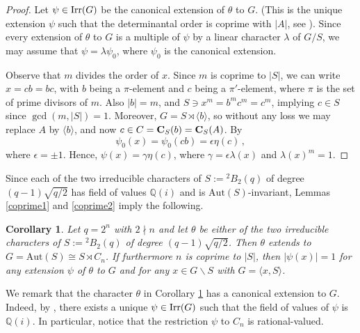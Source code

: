 \documentclass[11pt]{amsart}
\theoremstyle{plain}
\newtheorem{cor}[thm]{Corollary}
\theoremstyle{definition}
\numberwithin{thm}{section}
\numberwithin{equation}{thm}
\newcommand{\Aut}{\mathrm{Aut}}
\def\irr#1{{\rm Irr}(#1)}
\def\cent#1#2{{\bf C}_{#1}(#2)}
\newcommand{\Q}{{\mathbb Q}}
\newcommand{\0}{\emptyset}
\newcommand{\tw}[1]{{}^#1\!}
\begin{document}
\begin{proof}
Let $\psi \in \irr G$ be the canonical extension of $\theta$ to $G$.
(This is the unique extension $\psi$ such that the determinantal order is coprime with $|A|$, see \cite[Corollary 6.28]{Is}).
Since every extension of $\theta$ to $G$ is a multiple of $\psi$ by a linear character $\lambda$ of $G/S$, 
we may assume that $\psi = \lambda\psi_0$, where $\psi_0$ is the canonical extension.


Observe that $m$ divides the order of $x$. Since $m$ is coprime to $|S|$, we can write $x = cb=bc$, with
$b$ being a $\pi$-element and $c$ being a $\pi'$-element, where $\pi$ is the set of prime divisors of $m$.  
Also $|b|=m$, and $S \ni x^m = b^mc^m = c^m$, implying $c \in S$ since $\gcd(m,|S|)=1$. 
Moreover, $G = S \rtimes \langle b \rangle$, so without any loss we may replace $A$ by $\langle b \rangle$, and now 
$c \in C=\cent Sb=\cent SA$. 
By \cite[Theorem 13.6]{Is}
$$\psi_0(x)=\psi_0(cb)=\epsilon \eta(c) \, ,$$
where $\epsilon = \pm 1$.  
Hence, $\psi(x) = \gamma \eta(c)$, where $\gamma=\epsilon\lambda(x)$ and $\lambda(x)^m=1$.
\end{proof}

Since each of the two irreducible characters of $S:=\tw2 B_2(q)$ of degree $(q-1)\sqrt{q/2}$ has field of values $\Q(i)$ and is 
$\Aut(S)$-invariant, Lemmas \ref{coprime1} and \ref{coprime2} imply the following.

\begin{cor}\label{ext-suz}
Let $q=2^n$ with $2 \nmid n$ and let $\theta$ be either of the two irreducible characters of $S:=\tw2 B_2(q)$ of degree $(q-1)\sqrt{q/2}$. 
Then $\theta$ extends to $G = \Aut(S) \cong S \rtimes C_n$. If furthermore $n$ is coprime to $|S|$, then 
$|\psi(x)|=1$ for any extension $\psi$ of $\theta$ to $G$ and for any $x \in G \smallsetminus S$ with $G=\langle x,S \rangle$. 
\end{cor}

We remark that the character $\theta$ in Corollary \ref{ext-suz} has a canonical extension
to $G$. Indeed, by \cite[Theorem A]{N1}, there exists a unique $\psi \in {\rm Irr}(G)$ such that the field
of values of $\psi$ is $\Q(i)$. In particular, notice that the restriction $\psi$ to $C_n$ is rational-valued.
\end{document}
